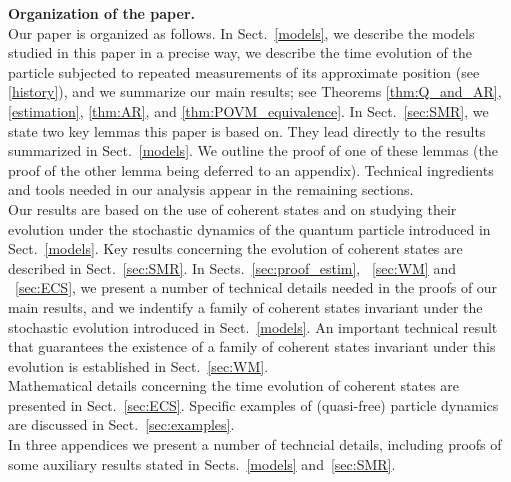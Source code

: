 \documentclass[11pt]{article}
\begin{document}
\bigskip
\noindent
{\bf{Organization of the paper}.}\\
Our paper is organized as follows. In Sect.~\ref{models}, we describe the models studied in this paper in a precise way, we describe the time evolution of the particle subjected to repeated measurements of its approximate position (see \eqref{history}),
and we summarize our main results; see Theorems \ref{thm:Q_and_AR}, \ref{estimation}, \ref{thm:AR}, and \ref{thm:POVM_equivalence}.
In Sect.~\ref{sec:SMR}, we state two key lemmas this paper is based on. They lead directly to the results 
summarized in Sect.~\ref{models}. We outline the proof of one of these lemmas (the proof of the other lemma being deferred to an appendix). Technical ingredients and tools needed in our analysis appear in the remaining sections.\\
Our results are based on the use of coherent states and on studying their evolution under the stochastic 
dynamics of the quantum particle introduced in Sect.~\ref{models}. Key results concerning the evolution of coherent states are described in Sect.~\ref{sec:SMR}. 
In Sects.~\ref{sec:proof_estim}, ~\ref{sec:WM} and ~\ref{sec:ECS}, we present a number of technical details needed in the proofs of our main results, and we indentify a family of coherent states invariant under the stochastic evolution introduced in Sect.~\ref{models}. An important technical result that guarantees the existence of a family of coherent states invariant under this evolution is established in Sect.~\ref{sec:WM}.\\
Mathematical details concerning the time evolution of coherent states are presented in Sect.~\ref{sec:ECS}. 
Specific examples of (quasi-free) particle dynamics are discussed in Sect.~\ref{sec:examples}. \\
In three appendices we present a number of techncial details, including proofs of some auxiliary results stated in 
Sects.~\ref{models} and~\ref{sec:SMR}. 
\end{document}

